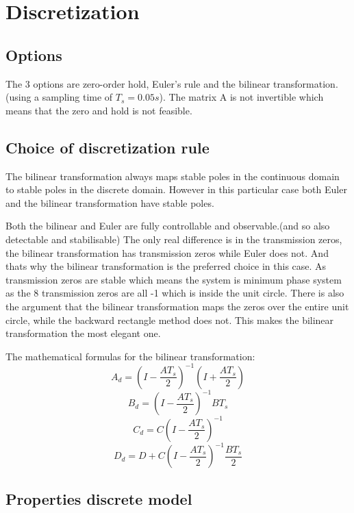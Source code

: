 \section{Discretization}
\subsection{Options}
The 3 options are zero-order hold, Euler's rule and the bilinear transformation. (using a sampling time of $T_s=0.05s$). The matrix A is not invertible which means that the zero and hold is not feasible. 

\subsection{Choice of discretization rule}
The bilinear transformation always maps stable poles in the continuous domain to stable poles in the discrete domain. However in this particular case both Euler and the bilinear transformation have stable poles. 

Both the bilinear and Euler are fully controllable and observable.(and so also detectable and stabilisable) The only real difference is in the transmission zeros, the  bilinear transformation has transmission zeros while Euler does not. And thats why the  bilinear transformation is the preferred choice in this case. As transmission zeros are stable which means the system is minimum phase system as the 8 transmission zeros are all -1 which is inside the unit circle. There is also the argument that the bilinear transformation maps the zeros over the entire unit circle, while the backward rectangle method does not. This makes the bilinear transformation the most elegant one.

The mathematical formulas for the bilinear transformation:
$$A_d= \left(I -  \frac{AT_s}{2}\right)^{-1} \left(I+\frac{AT_s}{2}\right)$$
$$B_d=\left(I -  \frac{AT_s}{2}\right)^{-1} B T_s$$
$$C_d=C\left(I -  \frac{AT_s}{2}\right)^{-1}$$
$$D_d=D+C\left(I -  \frac{AT_s}{2}\right)^{-1}\frac{BT_s}{2}$$


\subsection{Properties discrete model}
